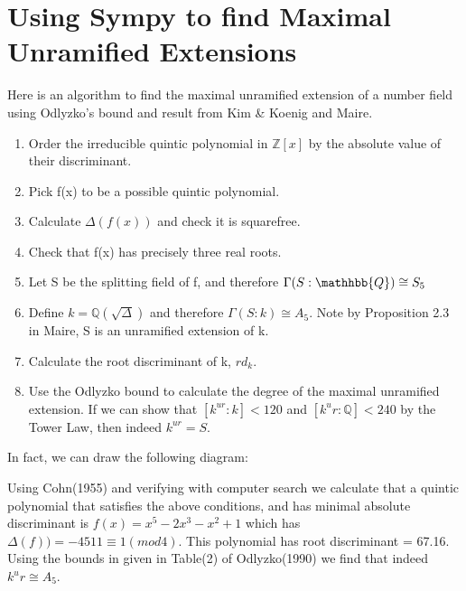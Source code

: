 \documentclass[preprint,12pt]{elsarticle}
\begin{document}
\section{Using Sympy to find Maximal Unramified Extensions}
Here is an algorithm to find the maximal unramified extension of a number field using Odlyzko's bound and result from Kim \& Koenig and Maire.
\begin{enumerate}
  \item  Order the irreducible quintic polynomial in $\mathbb{Z}[x]$ by the absolute value of their discriminant. 
  \item Pick f(x) to be a possible quintic polynomial.
  \item Calculate $\Delta(f(x))$ and check it is squarefree.
  \item Check that f(x) has precisely three real roots. 
  \item Let S be the splitting field of f, and therefore $\Gamma(S:\mathhbb{Q})\cong S_5$
  \item Define $k=\mathbb{Q}(\sqrt{\Delta})$ and therefore $\Gamma(S:k)\cong A_5$. Note by Proposition 2.3 in Maire, S is an unramified extension of k. 
  \item Calculate the root discriminant of k, $rd_k$.
  \item Use the Odlyzko bound to calculate the degree of the maximal unramified extension. If we can show that $[k^{ur}:k]<120$ and $[k^ur:\mathbb{Q}]<240$ by the Tower Law, then indeed $k^{ur} = S$.
\end{enumerate}
\newline
In fact, we can draw the following diagram: 
\newline
\begin{center}
\end{center}
\newline
Using Cohn(1955) and verifying with computer search we calculate that a quintic polynomial that satisfies the above conditions, and has minimal absolute discriminant is $f(x) = x^5-2x^3-x^2+1$ which has $\Delta(f)) = -4511\equiv1 (mod 4)$.
This polynomial has root discriminant = 67.16.
Using the bounds in given in Table(2) of Odlyzko(1990) we find that indeed $k^ur\cong A_{5}$. 
\end{document}
